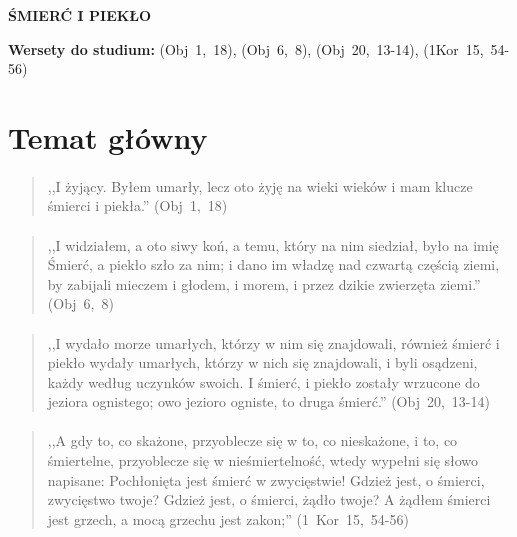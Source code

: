 \documentclass[10pt,a4paper,oneside]{article}
\begin{document}
\centerline{\textbf{\MakeUppercase{Śmierć i Piekło}}}
\begin{center}
\textbf{Wersety do studium:} \mbox{(Obj 1, 18)}, \mbox{(Obj 6, 8)}, \mbox{(Obj 20, 13-14)}, \mbox{(1Kor 15, 54-56)}
\end{center}
\section{Temat główny}
\paragraph{}
\begin{quote}
,,I żyjący. Byłem umarły, lecz oto żyję na wieki wieków i mam klucze śmierci i piekła.'' \mbox{(Obj 1, 18)}
\end{quote}
\paragraph{}
\begin{quote}
,,I widziałem, a oto siwy koń, a temu, który na nim siedział, było na imię Śmierć, a piekło szło za nim; i dano im władzę nad czwartą częścią ziemi, by zabijali mieczem i głodem, i morem, i przez dzikie zwierzęta ziemi.'' \mbox{(Obj 6, 8)}
\end{quote}
\paragraph{}
\begin{quote}
,,I wydało morze umarłych, którzy w nim się znajdowali, również śmierć i piekło wydały umarłych, którzy w nich się znajdowali, i byli osądzeni, każdy według uczynków swoich. I śmierć, i piekło zostały wrzucone do jeziora ognistego; owo jezioro ogniste, to druga śmierć.'' \mbox{(Obj 20, 13-14)}
\end{quote}
\paragraph{}
\begin{quote}
,,A gdy to, co skażone, przyoblecze się w to, co nieskażone, i to, co śmiertelne, przyoblecze się w nieśmiertelność, wtedy wypełni się słowo napisane: Pochłonięta jest śmierć w zwycięstwie! Gdzież jest, o śmierci, zwycięstwo twoje? Gdzież jest, o śmierci, żądło twoje? A żądłem śmierci jest grzech, a mocą grzechu jest zakon;'' \mbox{(1 Kor 15, 54-56)}
\end{quote}
\end{document}

